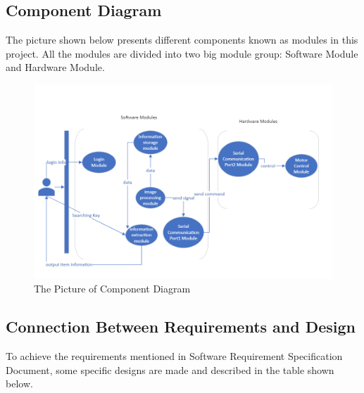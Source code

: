 \documentclass[12pt, titlepage]{article}
\begin{document}
\subsection{Component Diagram}
The picture shown below presents different components known as modules in this project. All the modules are divided into two big module group: Software Module and Hardware Module. 

\begin{figure}[H]
    \centering
    \includegraphics[scale=0.5]{Module.png}
    \caption{The Picture of Component Diagram}
\end{figure}

\subsection{Connection Between Requirements and Design} \label{SecConnection}

To achieve the requirements mentioned in Software Requirement Specification Document, some specific designs are made and described in the table shown below. 
\end{document}
